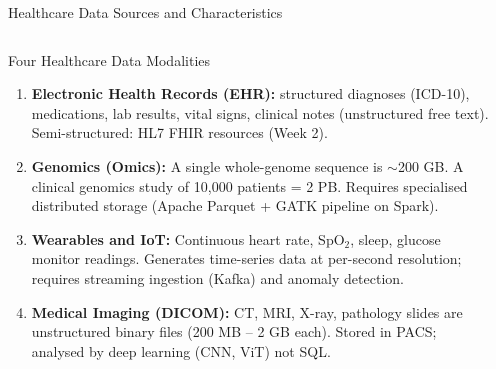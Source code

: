 \documentclass[aspectratio=169,10pt]{beamer}
\begin{document}
\begin{frame}{Healthcare Data Sources and Characteristics}
  \begin{columns}[T]
      \begin{block}{Four Healthcare Data Modalities}
        \begin{enumerate}
          \item \textbf{Electronic Health Records (EHR):} structured diagnoses (ICD-10), medications, lab results, vital signs, clinical notes (unstructured free text).  Semi-structured: HL7 FHIR resources (Week 2).
          \item \textbf{Genomics (Omics):}  A single whole-genome sequence is $\sim$200 GB.  A clinical genomics study of 10{,}000 patients = 2 PB.  Requires specialised distributed storage (Apache Parquet + GATK pipeline on Spark).
          \item \textbf{Wearables and IoT:}  Continuous heart rate, SpO$_2$, sleep, glucose monitor readings.  Generates time-series data at per-second resolution; requires streaming ingestion (Kafka) and anomaly detection.
          \item \textbf{Medical Imaging (DICOM):}  CT, MRI, X-ray, pathology slides are unstructured binary files (200 MB -- 2 GB each).  Stored in PACS; analysed by deep learning (CNN, ViT) not SQL.
        \end{enumerate}
      \end{block}

      \begin{center}
\end{center}
\end{columns}
\end{frame}
\end{document}
